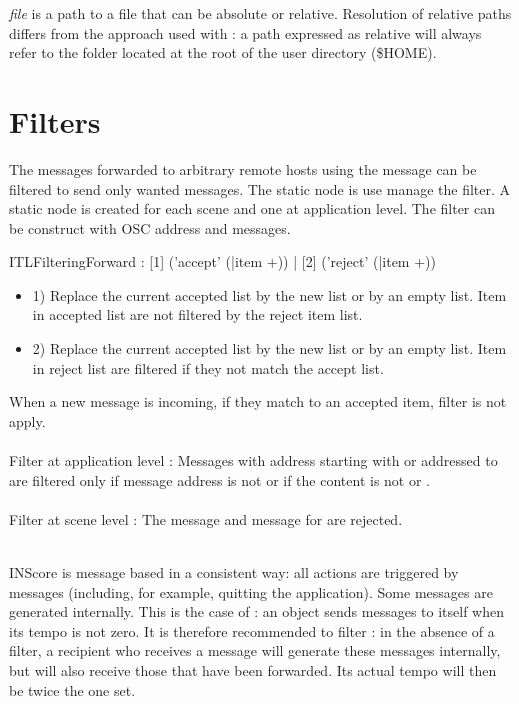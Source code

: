 \documentclass[a4paper,twoside]{report}
\newcommand{\sublevel}[1]	{\section{#1}}
\begin{document}
\emph{file} is a path to a file that can be absolute or relative. 
Resolution of relative paths differs from the approach used with : a path expressed as relative will always refer to the  folder located at the root of the user directory (\$HOME).


\sublevel{Filters}
\label{ITLFilteringForward}

The messages forwarded to arbitrary remote hosts using the  message can be filtered to send only wanted messages. The static  node is use manage the filter. A static  node is created for each scene and one at application level. The filter can be construct with OSC address and messages. 
 

\begin{rail}
ITLFilteringForward : [1] ('accept' (|item +)) | [2] ('reject' (|item +))
\end{rail}

\begin{itemize}
\item 1) Replace the current accepted list by the new list or by an empty list. Item in accepted list are not filtered by the reject item list.
\item 2) Replace the current accepted list by the new list or by an empty list. Item in reject list are filtered if they not match the accept list.
\end{itemize}

When a new message is incoming, if they match to an accepted item, filter is not apply.\\

\example\\
Filter at application level :
Messages with address starting with  or addressed to  are filtered only if message address is not  or if the content is not  or .\\
\\
Filter at scene level :
The  message and message for  are rejected.

\note{}\\
INScore is message based in a consistent way: all actions are triggered by messages (including, for example, quitting the application). Some messages are generated internally. This is the case of : an object sends  messages to itself when its tempo is not zero. It is therefore recommended to filter : in the absence of a filter, a recipient who receives a  message will generate these messages internally, but will also receive those that have been forwarded. Its actual tempo will then be twice the one set.
\end{document}
